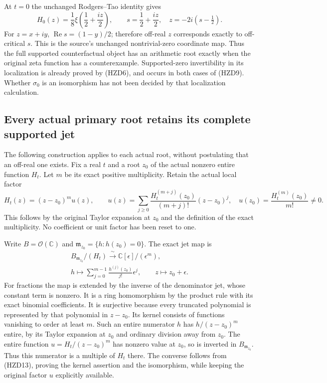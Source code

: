 At $t=0$ the unchanged Rodgers--Tao identity gives
\begin{equation}\tag{HZD12}
 H_0(z)=\frac18\xi\left(\frac12+\frac{iz}{2}\right),\qquad
 s=\frac12+\frac{iz}{2},\quad z=-2i(s-\tfrac12).
\end{equation}
For $z=x+iy$, $\operatorname{Re}s=(1-y)/2$; therefore off-real
$z$ corresponds exactly to off-critical $s$. This is the source's
unchanged nontrivial-zero coordinate map. Thus the full supported
counterfactual object has an arithmetic root exactly when the
original zeta function has a counterexample. Supported-zero
invertibility in its localization is already proved by (HZD6),
and occurs in both cases of (HZD9). Whether $\sigma_0$ is an
isomorphism has not been decided by that localization calculation.

\subsection{Every actual primary root retains its complete supported jet}

The following construction applies to each actual root, without
postulating that an off-real one exists. Fix a real $t$ and a root
$z_0$ of the actual nonzero entire function $H_t$. Let $m$ be its
exact positive multiplicity. Retain the actual local factor
\begin{equation}\tag{HZD13}
 H_t(z)=(z-z_0)^m u(z),\qquad
 u(z)=\sum_{j\ge0}\frac{H_t^{(m+j)}(z_0)}{(m+j)!}(z-z_0)^j,
 \quad u(z_0)=\frac{H_t^{(m)}(z_0)}{m!}\ne0.
\end{equation}
This follows by the original Taylor expansion at $z_0$ and the
definition of the exact multiplicity. No coefficient or unit
factor has been reset to one.

Write $B=\mathcal O(\mathbb C)$ and
$\mathfrak m_{z_0}=\{h:h(z_0)=0\}$. The exact jet map is
\begin{equation}\tag{HZD14}
\begin{gathered}
 B_{\mathfrak m_{z_0}}/(H_t)
   \xrightarrow{\ \sim\ }\mathbb C[\epsilon]/(\epsilon^m),\\
 h\longmapsto\sum_{j=0}^{m-1}\frac{h^{(j)}(z_0)}{j!}\epsilon^j,
 \qquad z\longmapsto z_0+\epsilon .
\end{gathered}
\end{equation}
For fractions the map is extended by the inverse of the denominator
jet, whose constant term is nonzero. It is a ring homomorphism by
the product rule with its exact binomial coefficients. It is
surjective because every truncated polynomial is represented by
that polynomial in $z-z_0$. Its kernel consists of functions
vanishing to order at least $m$. Such an entire numerator $h$
has $h/(z-z_0)^m$ entire, by its Taylor expansion at $z_0$ and
ordinary division away from $z_0$. The entire function
$u=H_t/(z-z_0)^m$ has nonzero value at $z_0$, so is inverted in
$B_{\mathfrak m_{z_0}}$. Thus this numerator is a multiple of
$H_t$ there. The converse follows from (HZD13), proving the
kernel assertion and the isomorphism, while keeping the original
factor $u$ explicitly available.

